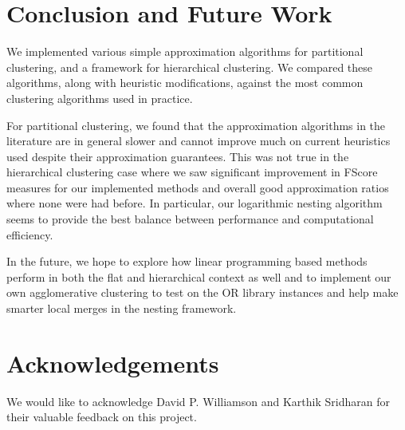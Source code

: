 \documentclass{article}
\begin{document}
\section{Conclusion and Future Work}
We implemented various simple approximation algorithms for partitional clustering, and a framework for hierarchical clustering.  We compared these algorithms, along with heuristic modifications, against the most common clustering algorithms used in practice.

For partitional clustering, we found that the approximation algorithms in the literature are in general slower and cannot improve much on current heuristics used despite their approximation guarantees. This was not true in the hierarchical clustering case where we saw significant improvement in FScore measures for our implemented methods and overall good approximation ratios where none were had before. In particular, our logarithmic nesting algorithm seems to provide the best balance between performance and computational efficiency.

In the future, we hope to explore how linear programming based methods perform in both the flat and hierarchical context as well and to implement our own agglomerative clustering to test on the OR library instances and help make smarter local merges in the nesting framework.

\section{Acknowledgements}
We would like to acknowledge David P. Williamson and Karthik Sridharan for their valuable feedback on this project.

\label{submission}




\end{document}
